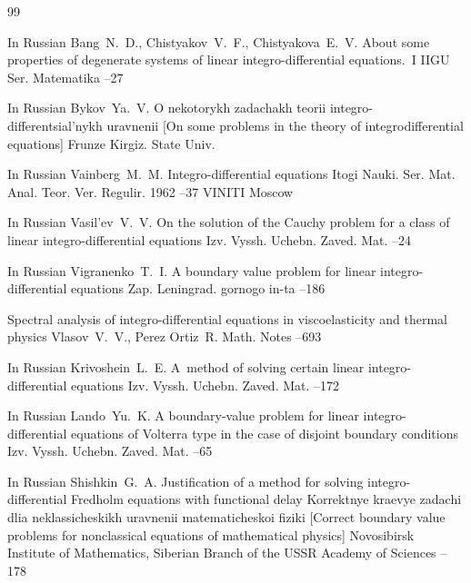 \begin{thebibliography}{99}
 

\lang In Russian
\by Bang~N.~D., Chistyakov~V.~F., Chistyakova~E.~V.
\paper About some properties of degenerate systems of linear integro-differential equations.~I
\jour IIGU Ser. Matematika
--27

\lang In Russian
\by Bykov~Ya.~V.
\book O nekotorykh zadachakh teorii integro-differentsial'nykh uravnenii \rm [On some problems in the theory of integrodifferential equations]
\publaddr Frunze
\publ Kirgiz. State Univ.


\lang In Russian
\by Vainberg~M.~M.
\paper Integro-differential equations
\serial Itogi Nauki. Ser. Mat. Anal. Teor. Ver. Regulir. 1962
--37
\publ VINITI
\publaddr Moscow


\lang In Russian
\by Vasil'ev~V.~V.
\paper On the solution of the Cauchy problem for a class of linear integro-differential equations
\jour Izv. Vyssh. Uchebn. Zaved. Mat.
--24

\lang In Russian
\by Vigranenko~T.~I.
\paper A boundary value problem for linear integro-differential equations
\jour Zap. Leningrad. gornogo in-ta
--186


\paper Spectral analysis of integro-differential equations in viscoelasticity and thermal physics
\by Vlasov~V.~V.,  Perez Ortiz~R.
\jour Math. Notes
--693

\lang In Russian
\by Krivoshein~L.~E.
\paper A~method of solving certain linear integro-differential equations
\jour Izv. Vyssh. Uchebn. Zaved. Mat.
--172

\lang In Russian
\by Lando~Yu.~K.
\paper A boundary-value problem for linear integro-differential equations of Volterra type in the case of disjoint boundary conditions
\jour Izv. Vyssh. Uchebn. Zaved. Mat.
--65

\lang In Russian
\by Shishkin~G.~A.
\paper Justification of a method for solving integro-differential Fredholm equations with functional delay
\inbook Korrektnye kraevye zadachi dlia neklassicheskikh uravnenii matematicheskoi fiziki \rm [Correct boundary value problems for nonclassical equations of mathematical physics]
\publaddr Novosibirsk
\publ Institute of Mathematics, Siberian Branch of the USSR Academy of Sciences
--178



\end{thebibliography}
